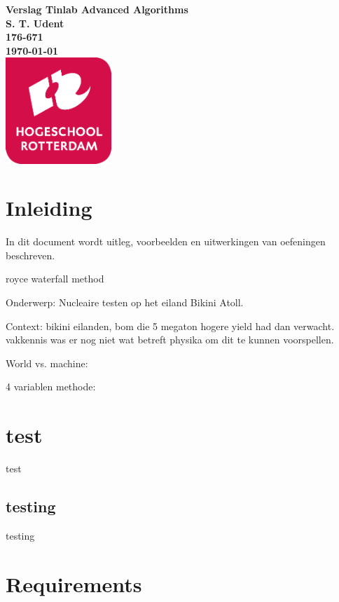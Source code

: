 \documentclass{article}
\begin{document}
\sffamily
\begin{titlepage}
  \centering
    \vfill
    {\bfseries\Huge
      Verslag Tinlab Advanced Algorithms \\
        \vskip2cm
      }
      {\bfseries\Large
        S. T. Udent\\
      }
      {
        \bfseries\normalsize
        176-671\\
        \vskip1cm
        \today\\
    }    
    \vfill
    \includegraphics[width=4cm]{logohr.png} %
    \vfill
    \vfill
\end{titlepage}
\newpage
\tableofcontents

\newpage
\section{Inleiding}
In dit document wordt uitleg, voorbeelden en uitwerkingen van oefeningen beschreven. 


royce waterfall method \newline



Onderwerp: 
Nucleaire testen op het eiland Bikini Atoll.

Context:
bikini eilanden, bom die 5 megaton hogere yield had dan verwacht. vakkennis was er nog niet wat betreft physika om dit te kunnen voorspellen.

World vs. machine:



4 variablen methode:




\section{test}
test
\subsection{testing}
testing
\section{Requirements}
\end{document}
